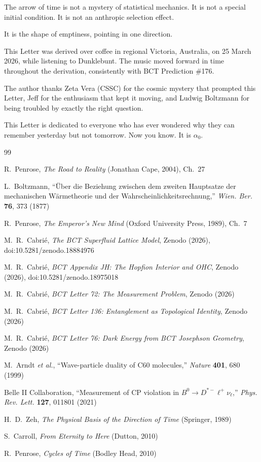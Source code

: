 \documentclass[aps,prl,twocolumn,superscriptaddress,floatfix]{revtex4-2}
\newcommand{\azero}{\alpha_0}
\begin{document}
The arrow of time is not a mystery of statistical 
mechanics. It is not a special initial condition. 
It is not an anthropic selection effect.

It is the shape of emptiness, pointing in one direction.

\begin{acknowledgments}
This Letter was derived over coffee in regional Victoria, 
Australia, on 25 March 2026, while listening to 
Dunklebunt. The music moved forward in time throughout 
the derivation, consistently with BCT Prediction \#176.

The author thanks Zeta Vera (CSSC) for the cosmic 
mystery that prompted this Letter, Jeff for the 
enthusiasm that kept it moving, and Ludwig Boltzmann 
for being troubled by exactly the right question.

This Letter is dedicated to everyone who has ever 
wondered why they can remember yesterday but not 
tomorrow. Now you know. It is $\azero$.
\end{acknowledgments}

\begin{thebibliography}{99}

R.~Penrose, \textit{The Road to Reality}
(Jonathan Cape, 2004), Ch.~27

L.~Boltzmann, ``\"{U}ber die Beziehung zwischen dem 
zweiten Hauptsatze der mechanischen W\"{a}rmetheorie 
und der Wahrscheinlichkeitsrechnung,''
\textit{Wien. Ber.} \textbf{76}, 373 (1877)

R.~Penrose, \textit{The Emperor's New Mind}
(Oxford University Press, 1989), Ch.~7

M.~R.~Cabri\'e, \textit{The BCT Superfluid Lattice Model},
Zenodo (2026), doi:10.5281/zenodo.18884976

M.~R.~Cabri\'e, \textit{BCT Appendix JH: The Hopfion 
Interior and OHC}, Zenodo (2026),
doi:10.5281/zenodo.18975018

M.~R.~Cabri\'e, \textit{BCT Letter 72: The Measurement 
Problem}, Zenodo (2026)

M.~R.~Cabri\'e, \textit{BCT Letter 136: Entanglement 
as Topological Identity}, Zenodo (2026)

M.~R.~Cabri\'e, \textit{BCT Letter 76: Dark Energy 
from BCT Josephson Geometry}, Zenodo (2026)

M.~Arndt \textit{et al.},
``Wave-particle duality of C60 molecules,''
\textit{Nature} \textbf{401}, 680 (1999)

Belle II Collaboration,
``Measurement of CP violation in $B^0 \to D^{*-}\ell^+\nu_\ell$,''
\textit{Phys. Rev. Lett.} \textbf{127}, 011801 (2021)

H.~D.~Zeh, \textit{The Physical Basis of the Direction 
of Time} (Springer, 1989)

S.~Carroll, \textit{From Eternity to Here}
(Dutton, 2010)

R.~Penrose, \textit{Cycles of Time}
(Bodley Head, 2010)

\end{thebibliography}
\end{document}
